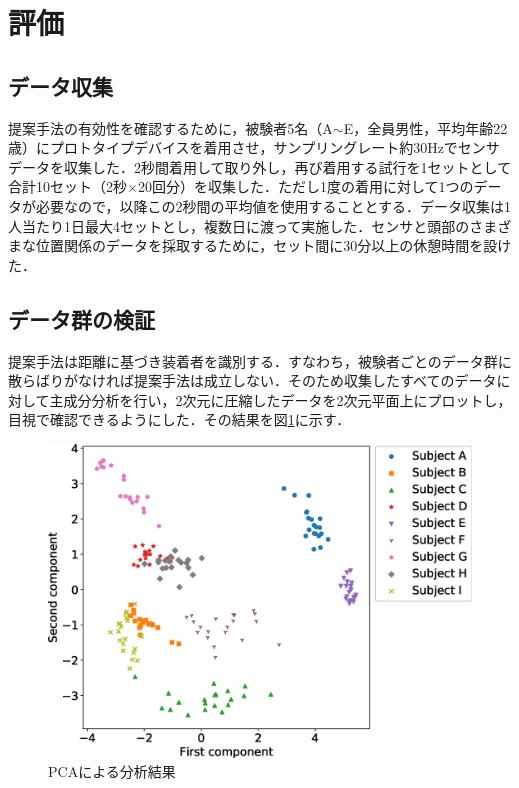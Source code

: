 \documentclass[Japanese]{dicomopapers}
\begin{document}
\section{評価}
\subsection{データ収集}
提案手法の有効性を確認するために，被験者5名（A$\sim$E，全員男性，平均年齢22歳）にプロトタイプデバイスを着用させ，サンプリングレート約30Hzでセンサデータを収集した．2秒間着用して取り外し，再び着用する試行を1セットとして合計10セット（2秒$\times$20回分）を収集した．ただし1度の着用に対して1つのデータが必要なので，以降この2秒間の平均値を使用することとする．データ収集は1人当たり1日最大4セットとし，複数日に渡って実施した．センサと頭部のさまざまな位置関係のデータを採取するために，セット間に30分以上の休憩時間を設けた．

\subsection{データ群の検証}
提案手法は距離に基づき装着者を識別する．すなわち，被験者ごとのデータ群に散らばりがなければ提案手法は成立しない．そのため収集したすべてのデータに対して主成分分析を行い，2次元に圧縮したデータを2次元平面上にプロットし，目視で確認できるようにした．その結果を図\ref{PCA}に示す．\par

\begin{figure}[!t]
  \begin{center}
    \includegraphics[width=1\linewidth]{figure/PCA.eps}
  \end{center}
  \caption{PCAによる分析結果}
  \label{PCA}
\end{figure}
\end{document}
